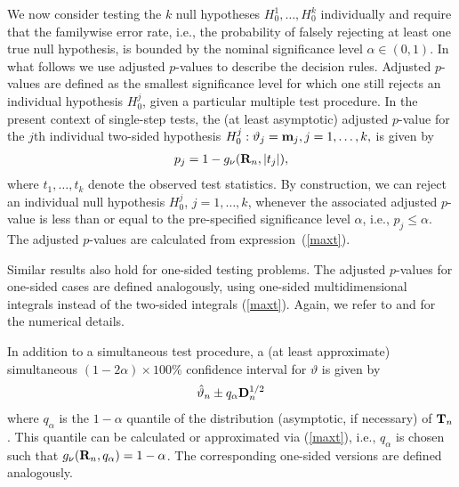 \documentclass[bimj,fleqn]{w-art}
\begin{document}
We now consider testing the $k$ null hypotheses $H_0^1, \ldots, H_0^k$
individually and require that the familywise error rate, i.e., the
probability of falsely rejecting at least one true null hypothesis, is
bounded by the nominal significance level $\alpha \in (0, 1)$. In what
follows we use adjusted $p$-values to describe the decision rules. Adjusted $%
p$-values are defined as the smallest significance level for which one still
rejects an individual hypothesis $H_0^j$, given a particular multiple test
procedure. In the present context of single-step tests, 
the (at least asymptotic) adjusted $p$-value for the $j$th
individual two-sided hypothesis $H_0^j: \vartheta_j = \mathbf{m}_j, j = 1,
\dots, k, $ is given by 
\begin{eqnarray*}
p_j = 1 - g_\nu(\mathbf{R}_n, |t_j|),
\end{eqnarray*}
where $t_1, \dots, t_k$ denote the observed test statistics. By
construction, we can reject an individual null hypothesis $H_0^j$, $j= 1,
\ldots, k$, whenever the associated adjusted $p$-value is less than or equal
to the pre-specified significance level $\alpha$, i.e., $p_j \leq \alpha$.
The adjusted $p$-values are calculated from expression~(\ref{maxt}).

Similar results also hold for one-sided testing problems. The adjusted 
$p$-values for one-sided cases are defined
analogously, using one-sided multidimensional integrals instead of the
two-sided integrals (\ref{maxt}). 
Again, we refer to \cite{Genz1992,GenzBretz1999,BretzGenzHothorn2001} and 
\cite{GenzBretz2002} for the numerical details.


In addition to a simultaneous test procedure, a (at least approximate) 
simultaneous $(1 - 2\alpha)
\times 100\%$ confidence interval for $\vartheta$ is given by 
\begin{eqnarray*}
\hat{\vartheta}_n \pm q_\alpha \mathbf{D}_n^{1/2}
\end{eqnarray*}
where $q_\alpha$ is the $1 - \alpha$ quantile of the distribution
(asymptotic, if necessary) of $\mathbf{T}_n$.
This quantile can be calculated or approximated via (\ref{maxt}), i.e.,
$q_\alpha$ is chosen such that $g_\nu(\mathbf{R}_n, q_\alpha) = 1 - \alpha$. 
The corresponding one-sided versions are defined analogously.
\end{document}
